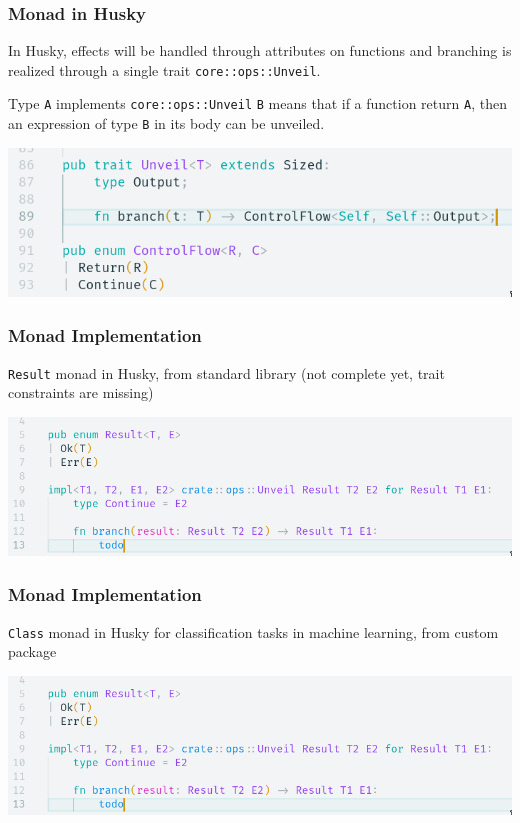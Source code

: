 \documentclass{beamer}   	%
\theoremstyle{definition}
\newcommand{\rust}[1]{\texttt{#1}}
\begin{document}
\begin{frame}
\frametitle{Monad in Husky}
 In Husky, effects will be handled through attributes on functions and branching is realized through a single trait \texttt{core::ops::Unveil}.

Type \rust{A} implements \texttt{core::ops::Unveil} \rust{B} means that if a function return \rust{A}, then an expression of type \rust{B} in its body can be unveiled.

 \includegraphics[width=\linewidth]{snapshots/husky_core_ops_unveil.png}
\end{frame}

\begin{frame}
\frametitle{Monad Implementation}
\texttt{Result} monad in Husky, from standard library (not complete yet, trait constraints are missing)

 \includegraphics[width=\linewidth]{snapshots/husky_impl_unveil_for_result.png}
\end{frame}

\begin{frame}
\frametitle{Monad Implementation}
\texttt{Class} monad in Husky for classification tasks in machine learning, from custom package

 \includegraphics[width=\linewidth]{snapshots/husky_impl_unveil_for_result.png}
\end{frame}
\end{document}
